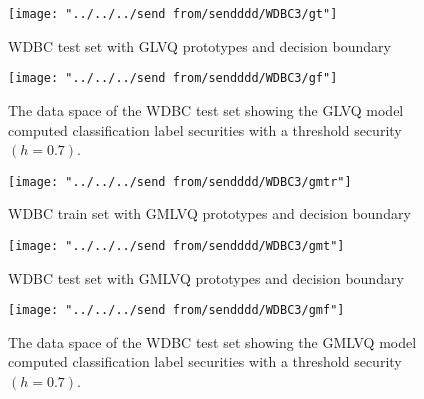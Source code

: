 \documentclass[english]{HSMW-Thesis}
\begin{document}
\begin{figure}[H]
	\centering
	\texttt{[image: "../../../send from/sendddd/WDBC3/gt"]}
	\caption[WDBC test set with GLVQ prototypes]{WDBC test set with GLVQ prototypes and decision boundary}
	\label{fig:wg2}
\end{figure}


\begin{figure}[H]
	\centering
	\texttt{[image: "../../../send from/sendddd/WDBC3/gf"]}
	\caption[WDBC test set classification label security (GLVQ)]{The data space of the WDBC test set showing the GLVQ model computed classification label securities with a threshold security $(h=0.7)$.}
	\label{fig:wgd1}
\end{figure}

\begin{figure}[H]
	\centering
	\texttt{[image: "../../../send from/sendddd/WDBC3/gmtr"]}
	\caption[WDBC train set with GMLVQ prototypes]{WDBC train set with GMLVQ prototypes and decision boundary}
	\label{fig:wgm1}
\end{figure}

\begin{figure}[H]
	\centering
	\texttt{[image: "../../../send from/sendddd/WDBC3/gmt"]}
	\caption[WDBC test set with GMLVQ prototypes]{WDBC test set with GMLVQ prototypes and decision boundary}
	\label{fig:wgm2}
\end{figure}


\begin{figure}[H]
	\centering
	\texttt{[image: "../../../send from/sendddd/WDBC3/gmf"]}
	\caption[WDBC test set classification label security (GMLVQ)]{The data space of the WDBC test set showing the GMLVQ model computed classification label securities with a threshold security $(h=0.7)$.}
	\label{fig:wgmld}
\end{figure}
\end{document}
